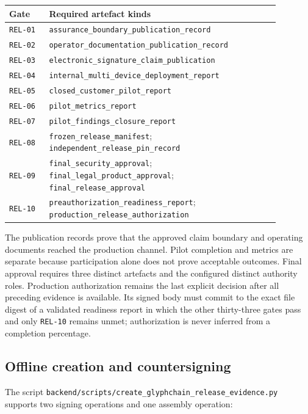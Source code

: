 \begin{center}
\begin{tabular}{p{0.13\linewidth}p{0.75\linewidth}}
\hline
\textbf{Gate} & \textbf{Required artefact kinds} \\
\hline
\texttt{REL-01} & \texttt{assurance\_boundary\_publication\_record} \\
\texttt{REL-02} & \texttt{operator\_documentation\_publication\_record} \\
\texttt{REL-03} & \texttt{electronic\_signature\_claim\_publication} \\
\texttt{REL-04} & \texttt{internal\_multi\_device\_deployment\_report} \\
\texttt{REL-05} & \texttt{closed\_customer\_pilot\_report} \\
\texttt{REL-06} & \texttt{pilot\_metrics\_report} \\
\texttt{REL-07} & \texttt{pilot\_findings\_closure\_report} \\
\texttt{REL-08} & \texttt{frozen\_release\_manifest};
\texttt{independent\_release\_pin\_record} \\
\texttt{REL-09} & \texttt{final\_security\_approval};
\texttt{final\_legal\_product\_approval};
\texttt{final\_release\_approval} \\
\texttt{REL-10} & \texttt{preauthorization\_readiness\_report};
\texttt{production\_release\_authorization} \\
\hline
\end{tabular}
\end{center}

The publication records prove that the approved claim boundary and operating
documents reached the production channel.  Pilot completion and metrics are
separate because participation alone does not prove acceptable outcomes.  Final
approval requires three distinct artefacts and the configured distinct authority
roles.  Production authorization remains the last explicit decision after all
preceding evidence is available.  Its signed body must commit to the exact file
digest of a validated readiness report in which the other thirty-three gates pass
and only \texttt{REL-10} remains unmet; authorization is never inferred from a
completion percentage.

\subsection{Offline creation and countersigning}

The script
\texttt{backend/scripts/create\_glyphchain\_release\_evidence.py} supports two
signing operations and one assembly operation:

